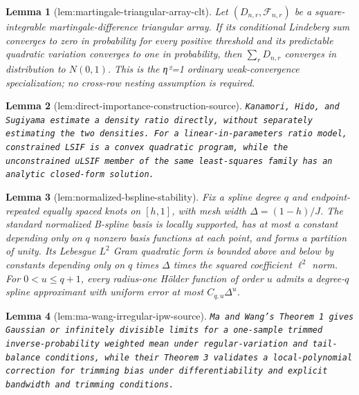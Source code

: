 \documentclass{article}
\newtheorem{lemma}{Lemma}
\begin{document}
\begin{lemma}[lem:martingale-triangular-array-clt]\label{lem:martingale-triangular-array-clt}
Let \((D_{n,r},\mathcal F_{n,r})\) be a square-integrable martingale-difference triangular array.  If its conditional Lindeberg sum converges to zero in probability for every positive threshold and its predictable quadratic variation converges to one in probability, then \(\sum_rD_{n,r}\) converges in distribution to \(N(0,1)\). This is the η²=1 ordinary weak-convergence specialization; no cross-row nesting assumption is required.
\end{lemma}

\begin{lemma}[lem:direct-importance-construction-source]\label{lem:direct-importance-construction-source}
\texttt{Kanamori,\allowbreak{} Hido,\allowbreak{} and Sugiyama estimate a density ratio directly,\allowbreak{} without separately estimating the two densities. For a linear-\allowbreak{}in-\allowbreak{}parameters ratio model,\allowbreak{} constrained LSIF is a convex quadratic program,\allowbreak{} while the unconstrained uLSIF member of the same least-\allowbreak{}squares family has an analytic closed-\allowbreak{}form solution.}
\end{lemma}

\begin{lemma}[lem:normalized-bspline-stability]\label{lem:normalized-bspline-stability}
Fix a spline degree \(q\) and endpoint-repeated equally spaced knots on \([h,1]\), with mesh width \(\Delta=(1-h)/J\). The standard normalized B-spline basis is locally supported, has at most a constant depending only on \(q\) nonzero basis functions at each point, and forms a partition of unity. Its Lebesgue \(L^2\) Gram quadratic form is bounded above and below by constants depending only on \(q\) times \(\Delta\) times the squared coefficient \(\ell^2\) norm. For \(0<u\le q+1\), every radius-one Hölder function of order \(u\) admits a degree-\(q\) spline approximant with uniform error at most \(C_{q,u}\Delta^u\).
\end{lemma}

\begin{lemma}[lem:ma-wang-irregular-ipw-source]\label{lem:ma-wang-irregular-ipw-source}
\texttt{Ma and Wang's Theorem 1 gives Gaussian or infinitely divisible limits for a one-\allowbreak{}sample trimmed inverse-\allowbreak{}probability weighted mean under regular-\allowbreak{}variation and tail-\allowbreak{}balance conditions,\allowbreak{} while their Theorem 3 validates a local-\allowbreak{}polynomial correction for trimming bias under differentiability and explicit bandwidth and trimming conditions.}
\end{lemma}
\end{document}
